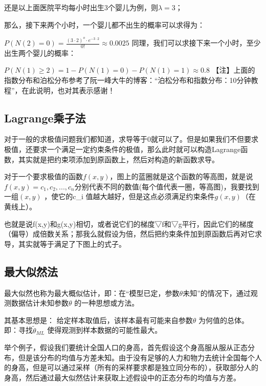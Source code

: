 \documentclass[11pt]{book}
\newcounter{#2}
\newcounter{#2}[#1]
\numberwithin{#2}{#1}
\begin{document}
还是以上面医院平均每小时出生3个婴儿为例，则$ \lambda =3 $；

那么，接下来两个小时，一个婴儿都不出生的概率可以求得为：

$ P\left( N\left(2 \right) =0 \right) =\frac{\left( 3\cdot 2 \right) ^{o} \cdot e^{-3\cdot 2} }{0!} \approx 0.0025 $
同理，我们可以求接下来一个小时，至少出生两个婴儿的概率：

$ P\left( N\left( 1 \right) \geq 2 \right) =1-P\left( N\left( 1 \right)=0  \right) - P\left( N\left( 1 \right)=1  \right)\approx 0.8 $
【注】上面的指数分布和泊松分布参考了阮一峰大牛的博客：“泊松分布和指数分布：10分钟教程”，在此说明，也对其表示感谢！

\subsection{Lagrange乘子法}

对于一般的求极值问题我们都知道，求导等于0就可以了。但是如果我们不但要求极值，还要求一个满足一定约束条件的极值，那么此时就可以构造Lagrange函数，其实就是把约束项添加到原函数上，然后对构造的新函数求导。

对于一个要求极值的函数$f\left( x,y \right) $，图上的蓝圈就是这个函数的等高图，就是说$ f\left( x,y \right) =c_{1} ,c_{2} ,...,c_{n} $分别代表不同的数值(每个值代表一圈，等高图)，我要找到一组$\left( x,y \right)$ ，使它的c_{i} 值越大越好，但是这点必须满足约束条件$g\left( x,y \right)$（在黄线上）。

也就是说f(x,y)和g(x,y)相切，或者说它们的梯度▽f和▽g平行，因此它们的梯度（偏导）成倍数关系；那我么就假设为\lambda 倍，然后把约束条件加到原函数后再对它求导，其实就等于满足了下图上的式子。

\subsection{最大似然法}

最大似然也称为最大概似估计，即：在“模型已定，参数$ θ $未知”的情况下，通过观测数据估计未知参数$ θ $ 的一种思想或方法。

其基本思想是： 给定样本取值后，该样本最有可能来自参数$ \theta $ 为何值的总体。即：寻找$ \tilde{\theta } _{ML} $ 使得观测到样本数据的可能性最大。

举个例子，假设我们要统计全国人口的身高，首先假设这个身高服从服从正态分布，但是该分布的均值与方差未知。由于没有足够的人力和物力去统计全国每个人的身高，但是可以通过采样（所有的采样要求都是独立同分布的），获取部分人的身高，然后通过最大似然估计来获取上述假设中的正态分布的均值与方差。
\end{document}
